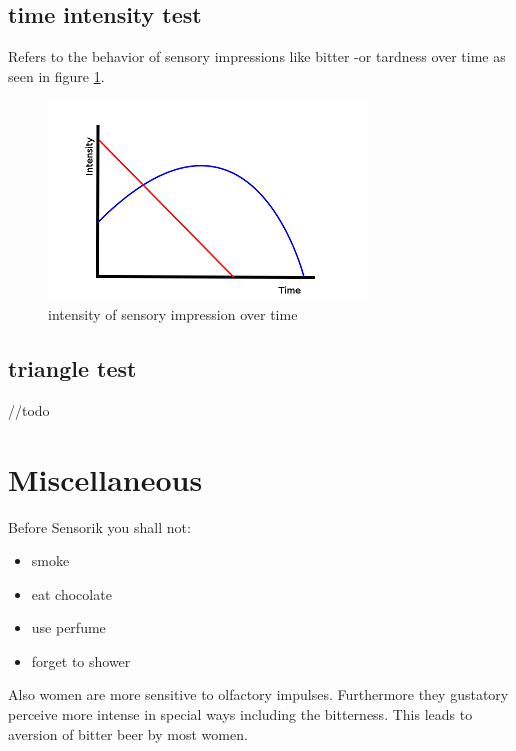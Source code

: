 \documentclass[]{scrartcl}
\begin{document}
\subsection{time intensity test}
Refers to the behavior of sensory impressions like bitter -or tardness over time
as seen in figure \ref{fig:time-intensity}.
\begin{figure}[h]
	\centering
	\includegraphics{time-intensity.png}
	\caption{intensity of sensory impression over time}
	\label{fig:time-intensity}
\end{figure}

\subsection{triangle test}
//todo

\newpage
\section{Miscellaneous}
Before Sensorik you shall not:
\begin{itemize}
  \item smoke
  \item eat chocolate
  \item use perfume
  \item forget to shower
\end{itemize}
Also women are more sensitive to olfactory impulses. Furthermore they gustatory perceive
more intense in special ways including the bitterness. This leads to aversion of bitter beer
by most women.
\end{document}
